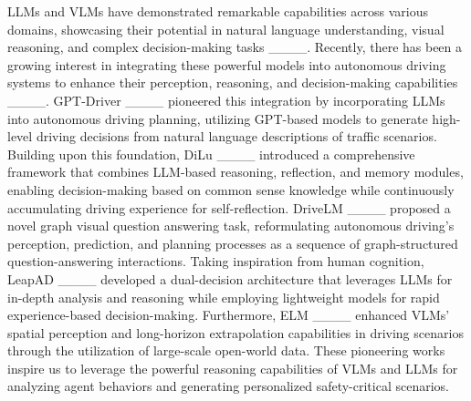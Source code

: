 LLMs and VLMs have demonstrated remarkable capabilities across various domains, showcasing their potential in natural language understanding, visual reasoning, and complex decision-making tasks ____. 
Recently, there has been a growing interest in integrating these powerful models into autonomous driving systems to enhance their perception, reasoning, and decision-making capabilities ____. 
GPT-Driver ____ pioneered this integration by incorporating LLMs into autonomous driving planning, utilizing GPT-based models to generate high-level driving decisions from natural language descriptions of traffic scenarios. 
Building upon this foundation, DiLu ____ introduced a comprehensive framework that combines LLM-based reasoning, reflection, and memory modules, enabling decision-making based on common sense knowledge while continuously accumulating driving experience for self-reflection. 
DriveLM ____ proposed a novel graph visual question answering task, reformulating autonomous driving's perception, prediction, and planning processes as a sequence of graph-structured question-answering interactions. 
Taking inspiration from human cognition, LeapAD ____ developed a dual-decision architecture that leverages LLMs for in-depth analysis and reasoning while employing lightweight models for rapid experience-based decision-making. 
Furthermore, ELM ____ enhanced VLMs' spatial perception and long-horizon extrapolation capabilities in driving scenarios through the utilization of large-scale open-world data.
These pioneering works inspire us to leverage the powerful reasoning capabilities of VLMs and LLMs for analyzing agent behaviors and generating personalized safety-critical scenarios.